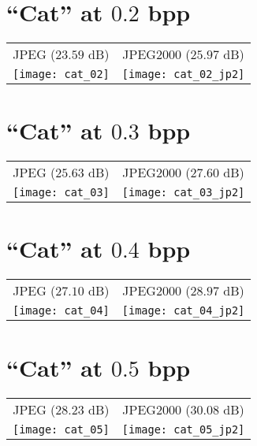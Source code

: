 \section*{``Cat'' at $0.2$ bpp}
\begin{center}
  \begin{tabular}{cc}
    JPEG ($23.59$ dB) & JPEG2000 ($25.97$ dB) \\
    \texttt{[image: cat\_02]} &
    \texttt{[image: cat\_02\_jp2]}
  \end{tabular}
\end{center}

\section*{``Cat'' at $0.3$ bpp}
\begin{center}
  \begin{tabular}{cc}
    JPEG ($25.63$ dB) & JPEG2000 ($27.60$ dB) \\
    \texttt{[image: cat\_03]} &
    \texttt{[image: cat\_03\_jp2]}
  \end{tabular}
\end{center}

\section*{``Cat'' at $0.4$ bpp}
\begin{center}
  \begin{tabular}{cc}
    JPEG ($27.10$ dB) & JPEG2000 ($28.97$ dB) \\
    \texttt{[image: cat\_04]} &
    \texttt{[image: cat\_04\_jp2]}
  \end{tabular}
\end{center}

\section*{``Cat'' at $0.5$ bpp}
\begin{center}
  \begin{tabular}{cc}
    JPEG ($28.23$ dB) & JPEG2000 ($30.08$ dB) \\
    \texttt{[image: cat\_05]} &
    \texttt{[image: cat\_05\_jp2]}
  \end{tabular}
\end{center}

